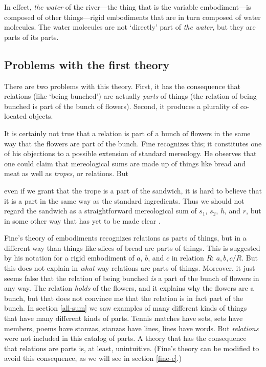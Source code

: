 \documentclass[11pt]{article}
\newenvironment{squote}{%
\begin{spacing}{1}
\begin{list}{}{%
\setlength{\labelwidth}{0pt}%
\rightmargin\leftmargin%
}
\item\relax
}{%
\end{list}%
\end{spacing}
}
\begin{document}
\begin{spacing}{1.5}
In effect, {\em the water} of the river---the thing that is the
variable embodiment---is composed of other things---rigid embodiments
that are in turn composed of water molecules.  The water molecules are
not `directly' part of {\em the water}, but they are parts of its
parts.

\subsection{Problems with the first theory}
\label{problems1}
There are two problems with this theory.  First, it has the
consequence that relations (like `being bunched') are actually {\em
  parts} of things (the relation of being bunched is part of the bunch
of flowers).  Second, it produces a plurality of co-located objects.

It is certainly not true that a relation is part of a bunch of flowers
in the same way that the flowers are part of the bunch.  Fine
recognizes this; it constitutes one of his objections to a possible
extension of standard mereology.  He observes that one could claim
that mereological sums are made up of things like bread and meat as
well as {\em tropes}, or relations.  But

\begin{squote}
even if we grant that the trope is a part of the sandwich, it is hard
to believe that it is a part in the same way as the standard
ingredients.  Thus we should not regard the sandwich as a
straightforward mereological sum of $s_1$, $s_2$, $h$, and $r$, but in
some other way that has yet to be made clear \citep[64]{fine1999}.
\end{squote}

Fine's theory of embodiments recognizes relations as parts of things,
but in a different way than things like slices of bread are parts of
things.  This is suggested by his notation for a rigid embodiment of
$a$, $b$, and $c$ in relation $R$: $a, b, c / R$.  But this does not
explain in {\em what} way relations are parts of things.  Moreover, it
just seems false that the relation of being bunched {\em is} a part of
the bunch of flowers in any way.  The relation {\em holds} of the
flowers, and it explains why the flowers are a bunch, but that does
not convince me that the relation is in fact part of the bunch.  In
section \ref{all-sum} we saw examples of many different kinds of
things that have many different kinds of parts.  Tennis matches have
sets, sets have members, poems have stanzas, stanzas have lines, lines
have words.  But {\em relations} were not included in this catalog of
parts.  A theory that has the consequence that relations are parts is,
at least, unintuitive.  (Fine's theory can be modified to avoid this
consequence, as we will see in section \ref{fine-c}.)


\end{spacing}
\end{document}
